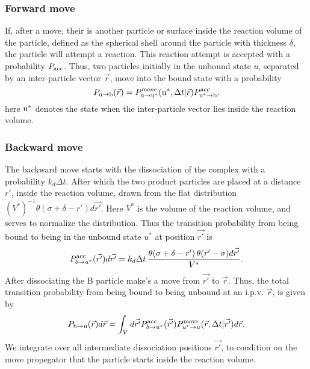 \subsubsection{Forward move}

If, after a move, their is another particle or surface inside the reaction volume of the particle, defined as the spherical shell around the particle with thickness $\delta$, the particle will attempt a reaction. This reaction attempt is accepted with a probability $P_{\rm acc}$. Thus, two particles initially in the unbound state $u$, separated by an inter-particle vector $\vec{r}$, move into the bound state with a probability
\begin{equation}
P_{ \rm{u} \rightarrow \rm{b} }(\vec{r}) = P^{\rm move}_{{\rm u} \rightarrow {\rm u}^*}({\rm u}^*,\Delta t|\vec{r}) P^{\rm acc}_{{\rm u}^* \rightarrow {\rm b}}.
\end{equation}
here ${\rm u}^*$ denotes the state when the inter-particle vector lies inside the reaction volume. 

\subsubsection{Backward move}

The backward move starts with the dissociation of the complex with a probability $k_d \Delta t$. After which the two product particles are placed at a distance $r'$, inside the reaction volume, drawn from the flat distribution $(V^*)^{-1} \theta(\sigma + \delta - r')d\vec{r'}$. Here $V^*$ is the volume of the reaction volume, and serves to normalize the distribution. Thus the transition probability from being bound to being in the unbound state $u^*$ at position $\vec{r'}$ is
\begin{equation}
 P^{\rm acc}_{b \rightarrow u^*}(\vec{r'})d\vec{r'} = k_d \Delta t \, \frac{\theta(\sigma + \delta - r') \, \theta(r' - \sigma) d\vec{r'}}{V^*}.
\end{equation}
After dissociating the B particle make's a move from $\vec{r'}$ to $\vec{r}$. Thus, the total transition probability from being bound to being unbound at an i.p.v. $\vec{r}$, is given by
\begin{equation}
P_{ \rm{b} \rightarrow \rm{u}}(\vec{r})d\vec{r} =  \int_{V} d\vec{r'} P^{\rm acc}_{b \rightarrow u^*}(\vec{r'}) P^{\rm move}_{u^* \rightarrow u}(\vec{r},\Delta t|\vec{r'})d\vec{r}.
\end{equation}
We integrate over all intermediate dissociation positions $\vec{r'}$, to condition on the move propegator that the particle starts inside the reaction volume.

